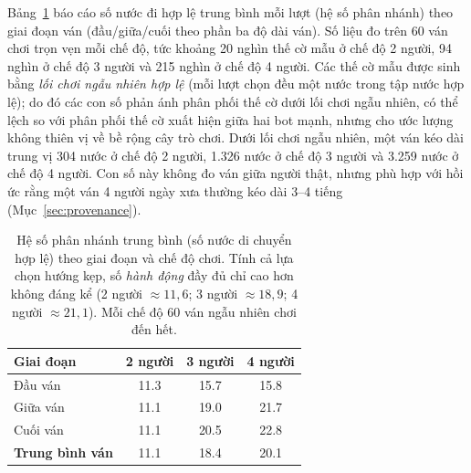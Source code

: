 Bảng~\ref{tab:branching} báo cáo số nước đi hợp lệ trung bình mỗi lượt (hệ số
phân nhánh) theo giai đoạn ván (đầu/giữa/cuối theo phần ba độ dài ván). Số liệu
đo trên 60 ván chơi trọn vẹn mỗi chế độ, tức khoảng 20 nghìn thế cờ mẫu ở
chế độ 2 người, 94 nghìn ở chế độ 3 người và 215 nghìn ở chế độ 4 người.
Các thế cờ mẫu được sinh
bằng \emph{lối chơi ngẫu nhiên hợp lệ} (mỗi lượt chọn đều một nước trong
tập nước hợp lệ); do đó các con số phản ánh phân phối thế cờ dưới lối chơi
ngẫu nhiên, có thể lệch so với phân phối thế cờ xuất hiện giữa hai bot
mạnh, nhưng cho ước lượng không thiên vị về bề rộng cây trò chơi. Dưới lối
chơi ngẫu nhiên, một ván kéo dài trung vị 304 nước ở chế độ 2 người, 1.326
nước ở chế độ 3 người và 3.259 nước ở chế độ 4 người. Con số này không đo ván
giữa người thật, nhưng phù hợp với hồi ức rằng một ván 4 người ngày xưa
thường kéo dài 3--4 tiếng (Mục~\ref{sec:provenance}).

\begin{table}[H]
  \centering
  \caption{Hệ số phân nhánh trung bình (số nước di chuyển hợp lệ) theo giai
  đoạn và chế độ chơi. Tính cả lựa chọn hướng kẹp, số \emph{hành động} đầy
  đủ chỉ cao hơn không đáng kể (2 người $\approx 11{,}6$; 3 người
  $\approx 18{,}9$; 4 người $\approx 21{,}1$). Mỗi chế độ 60 ván ngẫu nhiên
  chơi đến hết.}
  \label{tab:branching}
  \begin{tabular}{lccc}
    \toprule
    \textbf{Giai đoạn} & \textbf{2 người} & \textbf{3 người} & \textbf{4 người} \\
    \midrule
    Đầu ván  & 11.3 & 15.7 & 15.8 \\
    Giữa ván & 11.1 & 19.0 & 21.7 \\
    Cuối ván & 11.1 & 20.5 & 22.8 \\
    \midrule
    \textbf{Trung bình ván} & 11.1 & 18.4 & 20.1 \\
    \bottomrule
  \end{tabular}
\end{table}

